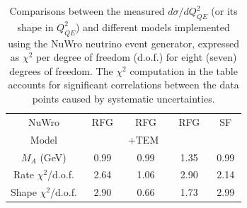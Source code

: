 \begingroup 
\squeezetable 
\begin{table} 
\begin{tabular}{c|cccc}
NuWro  &  ~RFG~ & ~RFG~  & ~RFG~ & ~SF~ \\  
Model   &          & +TEM~  & &  \\ \hline
$M_A$ (GeV) &  0.99 & 0.99 & 1.35 & 0.99  \\  \hline \hline
Rate $\chi^2$/d.o.f. & 2.64 & 1.06 & 2.90 & 2.14 \\
Shape $\chi^2$/d.o.f. & 2.90 & 0.66 & 1.73 & 2.99  \\
\end{tabular}
\caption{\label{tab:chi2} Comparisons between the measured $d\sigma/dQ^2_{QE}$ (or its shape in $Q^2_{QE}$) and different models implemented using the NuWro neutrino event generator, expressed as $\chi^2$ per degree of freedom (d.o.f.) for eight (seven) degrees of freedom.  The $\chi^2$ computation in the table accounts for significant 
correlations between the data points caused by systematic uncertainties. }
\end{table}
\endgroup

